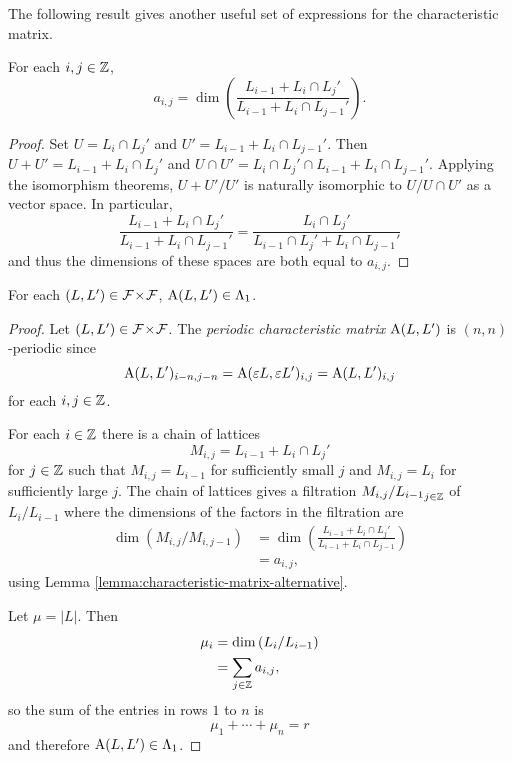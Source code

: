 \documentclass[a4paper, 11pt]{report}
\begin{document}
The following result gives another useful set of expressions for the characteristic matrix.
\begin{lemma}\label{lemma:characteristic-matrix-alternative}
For each $i,j\in\mathbb{Z}$,
\begin{equation*}
a_{i,j} = \dim\left(\frac{L_{i-1} + L_i\cap L_j'}{L_{i-1} + L_i\cap L_{j-1}'}\right).
\end{equation*}
\end{lemma}

\begin{proof}
Set $U=L_i\cap L_j'$ and $U'=L_{i-1}+L_i\cap L_{j-1}'$. Then $U+U'=L_{i-1}+L_i\cap L_j'$ and $U\cap U'= L_i\cap L_j'\cap L_{i-1} + L_i\cap L_{j-1}'$. Applying the isomorphism theorems, ${U+U'}/{U'}$ is naturally isomorphic to $U/{U\cap U'}$ as a vector space. In particular,
\begin{equation*}
\frac{L_{i-1}+L_i\cap L_j'}{L_{i-1} + L_i\cap L_{j-1}'} = \frac{L_i\cap L_j'}{L_{i-1}\cap L_j' + L_i\cap L_{j-1}'}
\end{equation*}
and thus the dimensions of these spaces are both equal to $a_{i,j}$.
\end{proof}

\begin{lemma}
For each $(L,L')\in{\mathcal{F}\!\times\!\mathcal{F}}$, $\operatorname{A}(L,L')\in\Lambda_1{}$.
\end{lemma}

\begin{proof}
Let $(L,L')\in{\mathcal{F}\!\times\!\mathcal{F}}$. The \emph{periodic characteristic matrix} $\operatorname{A}(L,L')$ is $(n,n)$-periodic since
\begin{equation*}
\operatorname{A}(L,L')_{i-n,j-n} = \operatorname{A}(\varepsilon L,\varepsilon L')_{i,j} = \operatorname{A}(L,L')_{i,j}
\end{equation*}
for each $i,j\in\mathbb{Z}$.

For each $i\in\mathbb{Z}$ there is a chain of lattices
\begin{equation*}
M_{i,j} = L_{i-1} + L_i\cap L_j'
\end{equation*}
for $j\in\mathbb{Z}$ such that $M_{i,j}=L_{i-1}$ for sufficiently small $j$ and $M_{i,j}=L_i$ for sufficiently large $j$. The chain of lattices gives a filtration $M_{i,j}/{L_{i-1}}_{j\in\mathbb{Z}}$ of $L_i/{L_{i-1}}$ where the dimensions of the factors in the filtration are
\begin{align*}
\dim\left(M_{i,j}/{M_{i,j-1}}\right)
&= \dim\left(\frac{L_{i-1} + L_i\cap L_j'}{L_{i-1} + L_i\cap L_{j-1}}\right)\\
&= a_{i,j},
\end{align*}
using Lemma \ref{lemma:characteristic-matrix-alternative}.

Let $\mu=|L|$. Then
\begin{align*}
\mu_i
&= \dim\left(L_i/{L_{i-1}}\right)\\
&= \sum_{j\in\mathbb{Z}} a_{i,j},
\end{align*}
so the sum of the entries in rows $1$ to $n$ is
\begin{equation*}
\mu_1+\cdots +\mu_n = r
\end{equation*}
and therefore $\operatorname{A}(L,L')\in\Lambda_1{}$.
\end{proof}
\end{document}
